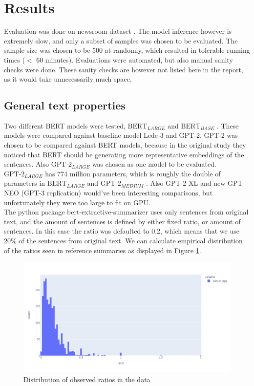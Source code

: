 \documentclass{article}
\newcommand{\bertlarge}{$\text{BERT}_{LARGE}$ }
\newcommand{\bertbase}{$\text{BERT}_{BASE}$ }
\newcommand{\gptmedium}{$\text{GPT-2}_{MEDIUM}$ }
\newcommand{\gptlarge}{$\text{GPT-2}_{LARGE}$ }
\begin{document}
\clearpage
\section{Results}

Evaluation was done on newsroom dataset \cite{dataset}. The model inference however is extremely slow, and only a subset of samples was chosen to be evaluated. The sample size was chosen to be 500 at randomly, which resulted in tolerable running times ($<$ 60 minutes). Evaluations were automated, but also manual sanity checks were done. These sanity checks are however not listed here in the report, as it would take unnecessarily much space. \\

\subsection{General text properties}

\noindent
Two different BERT models were tested, \bertlarge and \bertbase. These models were compared against baseline model Lede-3 and GPT-2. GPT-2 was chosen to be compared against BERT models, because in the original study \cite{extractive_bert} they noticed that BERT should be generating more representative embeddings of the sentences. Also \gptlarge was chosen as one model to be evaluated. \gptlarge has 774 million parameters, which is roughly the double of parameters in \bertlarge and \gptmedium. Also GPT-2-XL and new GPT-NEO (GPT-3 replication) would've been interesting comparisons, but unfortunately they were too large to fit on GPU.\\

\noindent
The python package bert-extractive-summarizer \cite{extractive_bert} uses only sentences from original text, and the amount of sentences is defined by either fixed ratio, or amount of sentences. In this case the ratio was defaulted to 0.2, which means that we use 20\% of the sentences from original text. We can calculate empirical distribution of the ratios seen in reference summaries as displayed in Figure \ref{fig:empirical_ratio}.


\noindent
\begin{figure}[H]
	\centering
	\hspace*{-3cm}
	\includegraphics[scale=0.55]{empirical_ratio.png}
	\caption{Distribution of observed ratios in the data}
	\label{fig:empirical_ratio}
\end{figure}
\end{document}
